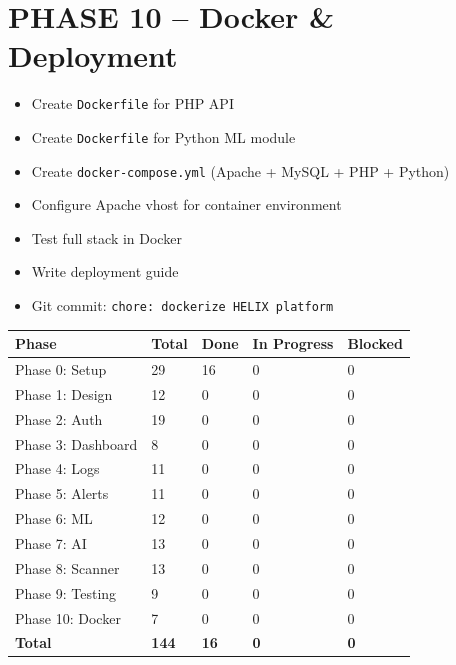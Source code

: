\documentclass[11pt,a4paper]{article}
\newcommand{\undone}{\textcolor{helixgray}{\texttt{[ ] }}}
\newcommand{\filepath}[1]{\texttt{\small#1}}
\newcommand{\task}[2]{\item[#1] #2}
\begin{document}
\section{PHASE 10 -- Docker \& Deployment}

\begin{itemize}
    \task{\undone}{Create \filepath{Dockerfile} for PHP API}
    \task{\undone}{Create \filepath{Dockerfile} for Python ML module}
    \task{\undone}{Create \filepath{docker-compose.yml} (Apache + MySQL + PHP + Python)}
    \task{\undone}{Configure Apache vhost for container environment}
    \task{\undone}{Test full stack in Docker}
    \task{\undone}{Write deployment guide}
    \task{\undone}{Git commit: \texttt{chore: dockerize HELIX platform}}
\end{itemize}

\vspace{1cm}
\begin{summarybox}[title=Progress Summary]
\begin{center}
\begin{tabular}{L{5cm} C{2cm} C{2cm} C{2cm} C{2cm}}
    \toprule
    \textbf{Phase} & \textbf{Total} & \textbf{Done} & \textbf{In Progress} & \textbf{Blocked} \\
    \midrule
    Phase 0: Setup & 29 & 16 & 0 & 0 \\
    Phase 1: Design & 12 & 0 & 0 & 0 \\
    Phase 2: Auth & 19 & 0 & 0 & 0 \\
    Phase 3: Dashboard & 8 & 0 & 0 & 0 \\
    Phase 4: Logs & 11 & 0 & 0 & 0 \\
    Phase 5: Alerts & 11 & 0 & 0 & 0 \\
    Phase 6: ML & 12 & 0 & 0 & 0 \\
    Phase 7: AI & 13 & 0 & 0 & 0 \\
    Phase 8: Scanner & 13 & 0 & 0 & 0 \\
    Phase 9: Testing & 9 & 0 & 0 & 0 \\
    Phase 10: Docker & 7 & 0 & 0 & 0 \\
    \midrule
    \textbf{Total} & \textbf{144} & \textbf{16} & \textbf{0} & \textbf{0} \\
    \bottomrule
\end{tabular}
\end{center}
\end{summarybox}
\end{document}
